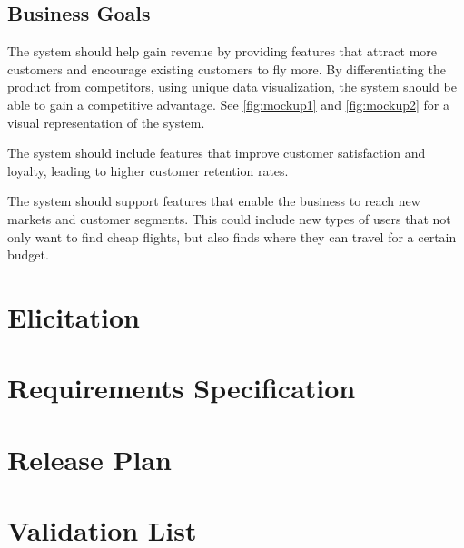 \documentclass[a4paper]{article}
\begin{document}
\subsection{Business Goals}
The system should help gain revenue by providing features that attract more customers and encourage existing customers to fly more. By differentiating the product from competitors, using unique data visualization, the system should be able to gain a competitive advantage.
See \autoref{fig:mockup1} and \autoref{fig:mockup2} for a visual representation of the system.

The system should include features that improve customer satisfaction and loyalty, leading to higher customer retention rates.

The system should support features that enable the business to reach new markets and customer segments. This could include new types of users that not only want to find cheap flights, but also finds where they can travel for a certain budget.

\section{Elicitation}


\newpage
\section{Requirements Specification}



\section{Release Plan}


\section{Validation List}


\end{document}

